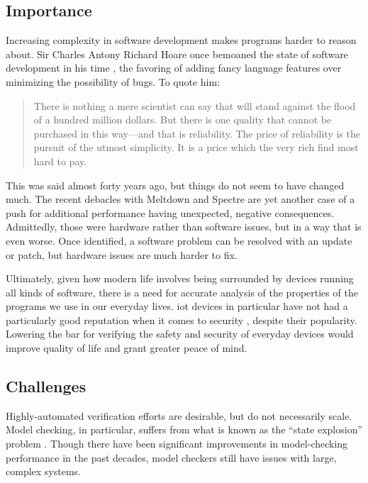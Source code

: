 \subsection{Importance}
Increasing complexity in software development makes programs harder to reason about.
Sir Charles Antony Richard Hoare
once bemoaned the state of software development in his time \autocite{hoare1980clothes},
the favoring of adding fancy language features over minimizing the possibility of bugs.
To quote him:
\begin{quote}
  There is nothing a mere scientist can say that will stand against the flood
  of a hundred million dollars. But there is one quality that cannot be purchased
  in this way---and that is reliability. The price of reliability is the pursuit of
  the utmost simplicity. It is a price which the very rich find most hard to pay.
\end{quote}
This was said almost forty years ago, but things do not seem to have changed much.
The recent debacles with Meltdown and Spectre  \autocite{lipp2018meltdown,kocher2018spectre}
are yet another case of a push for additional performance having unexpected,
negative consequences.
Admittedly, those were hardware rather than software issues,
but in a way that is even worse. Once identified, a software problem can be resolved
with an update or patch, but hardware issues are much harder to fix.

Ultimately, given how modern life involves being surrounded by devices
running all kinds of software, there is a need for accurate analysis
of the properties of the programs we use in our everyday lives.
\Ac{iot} devices in particular have not had a particularly good reputation
when it comes to security \autocite{zhang2014iot,zhao2013iot}, despite their popularity.
Lowering the bar for verifying the safety and security of everyday devices
would improve quality of life and grant greater peace of mind.

\subsection{Challenges}
Highly-automated verification efforts are desirable, but do not necessarily scale.
Model checking, in particular, suffers from what is known as the
``state explosion'' problem \autocite{clarke2012modelchecking}.
Though there have been significant improvements in model-checking performance
in the past decades, model checkers still have issues with large, complex systems.

